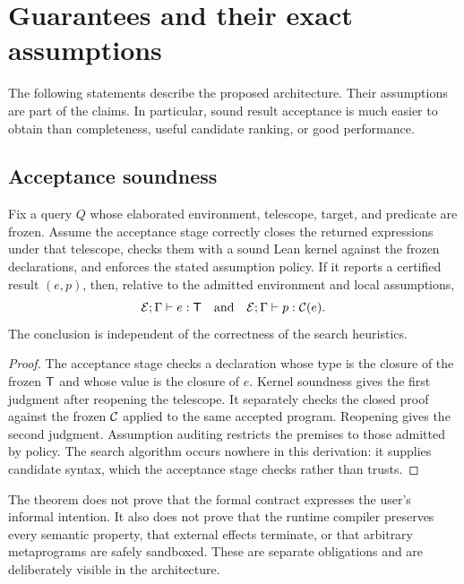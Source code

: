 \section{Guarantees and their exact assumptions}
\label{sec:guarantees}
The following statements describe the proposed architecture. Their assumptions are part of the claims. In particular, sound result acceptance is much easier to obtain than completeness, useful candidate ranking, or good performance.

\subsection{Acceptance soundness}
\begin{theorem}
\label{thm:sound}
Fix a query $Q$ whose elaborated environment, telescope, target, and predicate are frozen. Assume the acceptance stage correctly closes the returned expressions under that telescope, checks them with a sound Lean kernel against the frozen declarations, and enforces the stated assumption policy. If it reports a certified result $(e,p)$, then, relative to the admitted environment and local assumptions,
\[
  \mathcal{E};\Gamma\vdash e:\mathsf{T}\quad\text{and}\quad
  \mathcal{E};\Gamma\vdash p:\mathcal{C}(e).
\]
The conclusion is independent of the correctness of the search heuristics.
\end{theorem}
\begin{proof}
The acceptance stage checks a declaration whose type is the closure of the frozen $\mathsf{T}$ and whose value is the closure of $e$. Kernel soundness gives the first judgment after reopening the telescope. It separately checks the closed proof against the frozen $\mathcal{C}$ applied to the same accepted program. Reopening gives the second judgment. Assumption auditing restricts the premises to those admitted by policy. The search algorithm occurs nowhere in this derivation: it supplies candidate syntax, which the acceptance stage checks rather than trusts.
\end{proof}
The theorem does not prove that the formal contract expresses the user's informal intention. It also does not prove that the runtime compiler preserves every semantic property, that external effects terminate, or that arbitrary metaprograms are safely sandboxed. These are separate obligations and are deliberately visible in the architecture.

